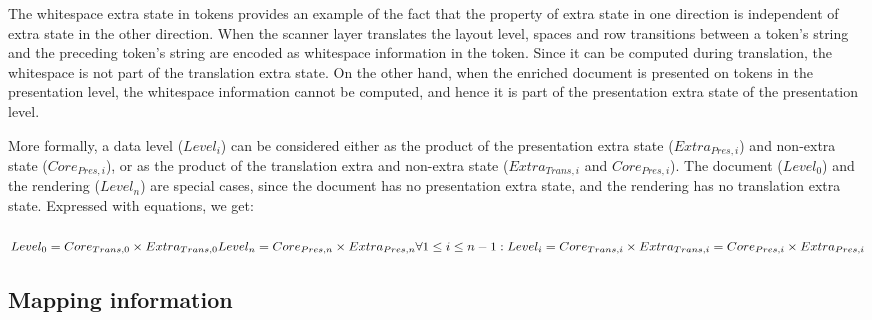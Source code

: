 The whitespace extra state in tokens provides an example of the fact that the property of extra state in one direction is independent of extra state in the other direction. When the scanner layer translates the layout level, spaces and row transitions between a token's string and the preceding token's string are encoded as whitespace information in the token. Since it can be computed during translation, the whitespace is not part of the translation extra state. On the other hand, when the enriched document is presented on tokens in the presentation level, the whitespace information cannot be computed, and hence it is part of the presentation extra state of the presentation level.
 


More formally, a data level ($Level_{i}$) can be considered either as the product of the presentation extra state ($Extra_{Pres,i}$) and non-extra state ($Core_{Pres,i}$), or as the product of the translation extra and non-extra state ($Extra_{Trans,i}$ and $Core_{Pres,i}$). The document ($Level_0$) and the rendering ($Level_n$) are special cases, since the document has no presentation extra state, and the rendering has no translation extra state. Expressed with equations, we get:

\begin{small}\begin{align*}%
\end{align*} 
\begin{math}
Level_{0} = Core_{Trans,0} \times Extra_{Trans,0}
Level_{n} = Core_{Pres,n} \times Extra_{Pres,n}
\forall 1 \le i \le n-1:  \\
Level_{i} = Core_{Trans,i} \times Extra_{Trans,i} = Core_{Pres,i} \times Extra_{Pres,i} 
\end{math}\end{small}


%																
\subsection{Mapping information}



